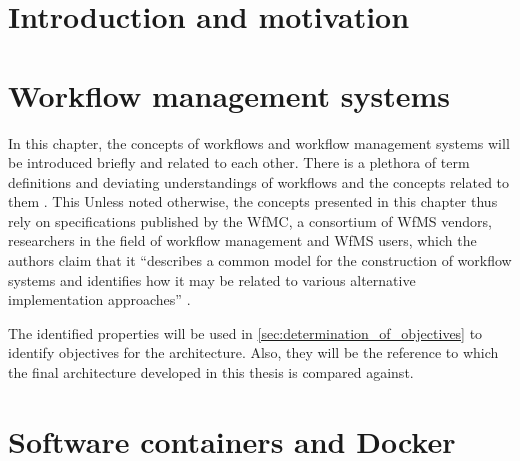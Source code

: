 \documentclass[language=english,noinputenc]{wiwwuwordrprt}
\begin{document}
  \newlength{\customtabwidth}
  \setlength{\customtabwidth}{\textwidth}
  \addtolength{\customtabwidth}{-\tabcolsep}
  \captionsetup{justification=centering}

  \EinfTitelseite

  \tableofcontents
  \listoffigures
  \listoftables
  \listoflistings

  

  \clearpage
  


  \chapter{Introduction and motivation} %
    \label{cha:introduction_and_motivation}
    

  \chapter{Workflow management systems} %
    \label{cha:workflow_management_systems}
    In this chapter, the concepts of workflows and workflow management systems will be introduced briefly and related to each other.
    There is a plethora of term definitions and deviating understandings of workflows and the concepts related to them \cite{Casati1999Specification}. This
    Unless noted otherwise, the concepts presented in this chapter thus rely on specifications published by the \ac{WfMC}, a consortium of \ac{WfMS} vendors, researchers in the field of workflow management and \ac{WfMS} users, which the authors claim that it ``describes a common model for the construction of workflow systems and identifies how it may be related to various alternative implementation approaches'' \cite{Hollingsworth1995Wfmc}.

    The identified properties will be used in \ref{sec:determination_of_objectives} to identify objectives for the architecture. Also, they will be the reference to which the final architecture developed in this thesis is compared against.
    

  \chapter{Software containers and Docker} %
    \label{cha:docker}
\end{document}
